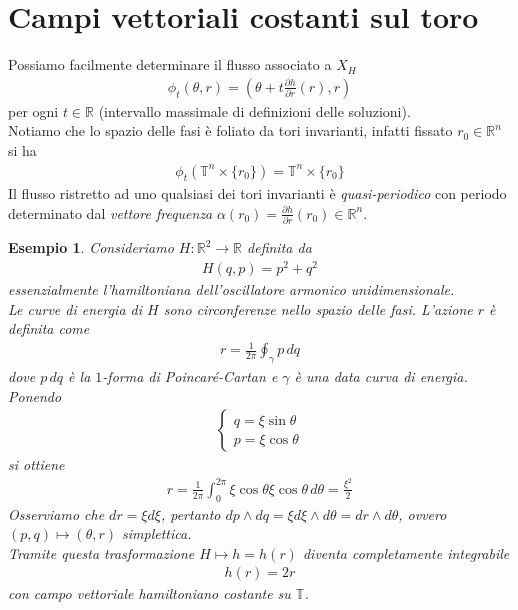 \documentclass[twoside, 11pt]{amsbook}
\newcommand{\0}{{(0)}}
\newcommand{\3}{{(3)}}
\theoremstyle{colonplain}
\theoremstyle{colondefinition}
\newtheorem{ex}[thm]{Esempio}
\theoremstyle{colonremark}
\numberwithin{equation}{chapter}
\begin{document}
\section{Campi vettoriali costanti sul toro}
Possiamo facilmente determinare il flusso associato a $X_H$ 
\begin{align}
    \phi_t(\theta, r) = \left(\theta + t\frac{\partial h}{\partial r}(r), r\right) 
\end{align}
per ogni $t \in \mathbb{R}$ (intervallo massimale di definizioni delle soluzioni). \\
Notiamo che lo spazio delle fasi è foliato da tori invarianti, infatti fissato $r_0 \in \mathbb{R}^n$ si ha 
\begin{align}
    \phi_t\left(\mathbb{T}^n \times \{r_0\}\right) = \mathbb{T}^n \times \{r_0\} 
\end{align}
Il flusso ristretto ad uno qualsiasi dei tori invarianti è \textit{quasi-periodico} con periodo determinato dal \textit{vettore frequenza} $\alpha(r_0) = \frac{\partial h}{\partial r}(r_0) \in \mathbb{R}^n$.
\begin{ex}
Consideriamo $H : \mathbb{R}^{2} \longrightarrow \mathbb{R}$ definita da
\begin{align}
    H(q, p) = p^2 + q^2
\end{align}
essenzialmente l'hamiltoniana dell'oscillatore armonico unidimensionale. \\
Le curve di energia di $H$ sono circonferenze nello spazio delle fasi. L'azione $r$ è definita come
\begin{align}
    r = \frac{1}{2\pi}\oint_\gamma p \, dq 
\end{align}
dove $p \, dq$ è la $1$-forma di Poincaré-Cartan e $\gamma$ è una data curva di energia. \\
Ponendo
\begin{align}
    \begin{cases}
        q = \xi\sin\theta \\
        p = \xi\cos\theta
    \end{cases}
\end{align}
si ottiene
\begin{align}
    r = \frac{1}{2\pi}\int_0^{2\pi} \xi\cos\theta \xi\cos\theta \, d\theta = \frac{\xi^2}{2}
\end{align}
Osserviamo che $dr = \xi d\xi$, pertanto $dp \wedge dq = \xi d\xi \wedge d\theta = dr \wedge d\theta$, ovvero $(p, q) \mapsto (\theta, r)$ simplettica. \\
Tramite questa trasformazione $H \mapsto h = h(r)$ diventa completamente integrabile
\begin{align}
    h(r) = 2r
\end{align}
con campo vettoriale hamiltoniano costante su $\mathbb{T}$.
\end{ex}
\end{document}
